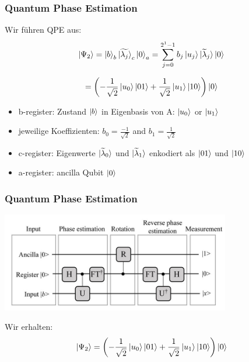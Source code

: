 \begin{frame}
    \frametitle{Quantum Phase Estimation}
    
    Wir führen QPE aus:
    $$\ket{\Psi_2} = \ket{b}_b \ket{\widetilde{\lambda_j}}_c\ket{0}_a
     =\sum_{j=0}^{2^{1}-1} b_j \ket{u_j} \ket{ \widetilde{\lambda}_j} \ket{0}$$

    $$=\left(-\frac{1}{\sqrt{2}} \ket{u_0} \ket{01} +\frac{1}{\sqrt{2}}  
    \ket{u_1} \ket{10} \right)  \ket{0}$$

    \hfil

    \hfil

    \begin{itemize}
    \item b-register: Zustand $\ket{b}$ in Eigenbasis von A: $ \ket{u_0}$ or $\ket{u_1}$
    \item jeweilige Koeffizienten: $b_0 =\frac{-1}{\sqrt{2}}$ and  $b_1 =\frac{1}{\sqrt{2}}$
    \item c-register: Eigenwerte $\ket{\widetilde{\lambda}_0}$ und $\ket{\widetilde{\lambda}_1}$ enkodiert als  $\ket{01}$ und $\ket{10}$
    \item a-register: ancilla Qubit $\ket{0}$ 
    \end{itemize}
\end{frame}

\begin{frame}
    \frametitle{Quantum Phase Estimation}
    \begin{center}
    \includegraphics[width=10cm]{img/hhl_circuit.jpg}
    \end{center}

    Wir erhalten:
    $$\ket{\Psi_2} =\left(-\frac{1}{\sqrt{2}} \ket{u_0} \ket{01} +\frac{1}{\sqrt{2}}  
    \ket{u_1} \ket{10} \right)  \ket{0}$$

\end{frame}




